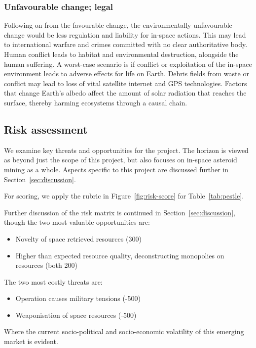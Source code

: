 \documentclass[conference]{IEEEtran}
\begin{document}
\subsubsection{Unfavourable change; legal}
Following on from the favourable change, the environmentally unfavourable change would be less regulation and liability for in-space actions. This may lead to international warfare and crimes committed with no clear authoritative body. Human conflict leads to habitat and environmental destruction, alongside the human suffering. A worst-case scenario is if conflict or exploitation of the in-space environment leads to adverse effects for life on Earth. Debris fields from waste or conflict may lead to loss of vital satellite internet and GPS technologies. Factors that change Earth's albedo affect the amount of solar radiation that reaches the surface, thereby harming ecosystems through a causal chain.

\subsection{Risk assessment}
We examine key threats and opportunities for the project. The horizon is viewed as beyond just the scope of this project, but also focuses on in-space asteroid mining as a whole. Aspects specific to this project are discussed further in Section~\ref{sec:discussion}.

For scoring, we apply the rubric in Figure~\ref{fig:risk-score} for Table~\ref{tab:pestle}.

Further discussion of the risk matrix is continued in Section~\ref{sec:discussion}, though the two most valuable opportunities are:

\begin{itemize}
    \item Novelty of space retrieved resources (300)
    \item Higher than expected resource quality, deconstructing monopolies on resources (both 200)
\end{itemize}

The two most costly threats are:

\begin{itemize}
    \item Operation causes military tensions (-500)
    \item Weaponisation of space resources (-500)
\end{itemize}

Where the current socio-political and socio-economic volatility of this emerging market is evident.
\end{document}

